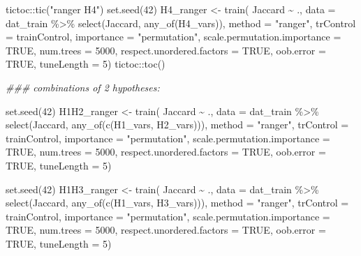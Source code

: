 \documentclass[
  letterpaper,
  DIV=11,
  numbers=noendperiod]{scrartcl}
\newenvironment{Shaded}{\begin{snugshade}}{\end{snugshade}}
\newcommand{\AttributeTok}[1]{\textcolor[rgb]{0.40,0.45,0.13}{#1}}
\newcommand{\ConstantTok}[1]{\textcolor[rgb]{0.56,0.35,0.01}{#1}}
\newcommand{\DecValTok}[1]{\textcolor[rgb]{0.68,0.00,0.00}{#1}}
\newcommand{\DocumentationTok}[1]{\textcolor[rgb]{0.37,0.37,0.37}{\textit{#1}}}
\newcommand{\FunctionTok}[1]{\textcolor[rgb]{0.28,0.35,0.67}{#1}}
\newcommand{\NormalTok}[1]{\textcolor[rgb]{0.00,0.23,0.31}{#1}}
\newcommand{\OtherTok}[1]{\textcolor[rgb]{0.00,0.23,0.31}{#1}}
\newcommand{\SpecialCharTok}[1]{\textcolor[rgb]{0.37,0.37,0.37}{#1}}
\newcommand{\StringTok}[1]{\textcolor[rgb]{0.13,0.47,0.30}{#1}}
\begin{document}
\begin{Shaded}
\begin{Highlighting}[]
\NormalTok{tictoc}\SpecialCharTok{::}\FunctionTok{tic}\NormalTok{(}\StringTok{"ranger H4"}\NormalTok{)}
\FunctionTok{set.seed}\NormalTok{(}\DecValTok{42}\NormalTok{)}
\NormalTok{H4\_ranger }\OtherTok{\textless{}{-}} \FunctionTok{train}\NormalTok{(}
\NormalTok{    Jaccard }\SpecialCharTok{\textasciitilde{}}\NormalTok{ .,}
    \AttributeTok{data =}\NormalTok{ dat\_train }\SpecialCharTok{\%\textgreater{}\%} \FunctionTok{select}\NormalTok{(Jaccard, }\FunctionTok{any\_of}\NormalTok{(H4\_vars)),}
    \AttributeTok{method =} \StringTok{"ranger"}\NormalTok{,}
    \AttributeTok{trControl =}\NormalTok{ trainControl,}
    \AttributeTok{importance =} \StringTok{"permutation"}\NormalTok{,}
    \AttributeTok{scale.permutation.importance =} \ConstantTok{TRUE}\NormalTok{,}
    \AttributeTok{num.trees =} \DecValTok{5000}\NormalTok{,}
    \AttributeTok{respect.unordered.factors =} \ConstantTok{TRUE}\NormalTok{,}
    \AttributeTok{oob.error =} \ConstantTok{TRUE}\NormalTok{,}
    \AttributeTok{tuneLength =} \DecValTok{5}\NormalTok{)}
\NormalTok{tictoc}\SpecialCharTok{::}\FunctionTok{toc}\NormalTok{()}


\DocumentationTok{\#\#\# combinations of 2 hypotheses:}

\FunctionTok{set.seed}\NormalTok{(}\DecValTok{42}\NormalTok{)}
\NormalTok{H1H2\_ranger }\OtherTok{\textless{}{-}} \FunctionTok{train}\NormalTok{(}
\NormalTok{    Jaccard }\SpecialCharTok{\textasciitilde{}}\NormalTok{ .,}
    \AttributeTok{data =}\NormalTok{ dat\_train }\SpecialCharTok{\%\textgreater{}\%} \FunctionTok{select}\NormalTok{(Jaccard, }\FunctionTok{any\_of}\NormalTok{(}\FunctionTok{c}\NormalTok{(H1\_vars, H2\_vars))),}
    \AttributeTok{method =} \StringTok{"ranger"}\NormalTok{,}
    \AttributeTok{trControl =}\NormalTok{ trainControl,}
    \AttributeTok{importance =} \StringTok{"permutation"}\NormalTok{,}
    \AttributeTok{scale.permutation.importance =} \ConstantTok{TRUE}\NormalTok{,}
    \AttributeTok{num.trees =} \DecValTok{5000}\NormalTok{,}
    \AttributeTok{respect.unordered.factors =} \ConstantTok{TRUE}\NormalTok{,}
    \AttributeTok{oob.error =} \ConstantTok{TRUE}\NormalTok{,}
    \AttributeTok{tuneLength =} \DecValTok{5}\NormalTok{)}

\FunctionTok{set.seed}\NormalTok{(}\DecValTok{42}\NormalTok{)}
\NormalTok{H1H3\_ranger }\OtherTok{\textless{}{-}} \FunctionTok{train}\NormalTok{(}
\NormalTok{    Jaccard }\SpecialCharTok{\textasciitilde{}}\NormalTok{ .,}
    \AttributeTok{data =}\NormalTok{ dat\_train }\SpecialCharTok{\%\textgreater{}\%} \FunctionTok{select}\NormalTok{(Jaccard, }\FunctionTok{any\_of}\NormalTok{(}\FunctionTok{c}\NormalTok{(H1\_vars, H3\_vars))),}
    \AttributeTok{method =} \StringTok{"ranger"}\NormalTok{,}
    \AttributeTok{trControl =}\NormalTok{ trainControl,}
    \AttributeTok{importance =} \StringTok{"permutation"}\NormalTok{,}
    \AttributeTok{scale.permutation.importance =} \ConstantTok{TRUE}\NormalTok{,}
    \AttributeTok{num.trees =} \DecValTok{5000}\NormalTok{,}
    \AttributeTok{respect.unordered.factors =} \ConstantTok{TRUE}\NormalTok{,}
    \AttributeTok{oob.error =} \ConstantTok{TRUE}\NormalTok{,}
    \AttributeTok{tuneLength =} \DecValTok{5}\NormalTok{)}


\end{Highlighting}
\end{Shaded}
\end{document}
